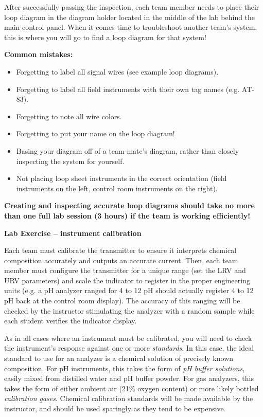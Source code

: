 \documentclass[12pt,a4paper]{article}
\begin{document}
After successfully passing the inspection, each team member needs to place their loop diagram in the diagram holder located in the middle of the lab behind the main control panel.  When it comes time to troubleshoot another team's system, this is where you will go to find a loop diagram for that system!

\vskip 10pt

{\bf Common mistakes:}

\begin{itemize}
\item{} Forgetting to label all signal wires (see example loop diagrams).
\item{} Forgetting to label all field instruments with their own tag names (e.g. AT-83).
\item{} Forgetting to note all wire colors.
\item{} Forgetting to put your name on the loop diagram!
\item{} Basing your diagram off of a team-mate's diagram, rather than closely inspecting the system for yourself.
\item{} Not placing loop sheet instruments in the correct orientation (field instruments on the left, control room instruments on the right).
\end{itemize}

\vskip 10pt

{\bf Creating and inspecting accurate loop diagrams should take no more than one full lab session (3 hours) if the team is working efficiently!}





\vfil \eject

\noindent
{\bf Lab Exercise -- instrument calibration}

\vskip 5pt

Each team must calibrate the transmitter to ensure it interprets chemical composition accurately and outputs an accurate current.  Then, each team member must configure the transmitter for a unique range (set the LRV and URV parameters) and scale the indicator to register in the proper engineering units (e.g. a pH analyzer ranged for 4 to 12 pH should actually register 4 to 12 pH back at the control room display).  The accuracy of this ranging will be checked by the instructor stimulating the analyzer with a random sample while each student verifies the indicator display.

As in all cases where an instrument must be calibrated, you will need to check the instrument's response against one or more {\it standards}.  In this case, the ideal standard to use for an analyzer is a chemical solution of precisely known composition.  For pH instruments, this takes the form of {\it pH buffer solutions}, easily mixed from distilled water and pH buffer powder.  For gas analyzers, this takes the form of either ambient air (21\% oxygen content) or more likely bottled {\it calibration gases}.  Chemical calibration standards will be made available by the instructor, and should be used sparingly as they tend to be expensive.
\end{document}
